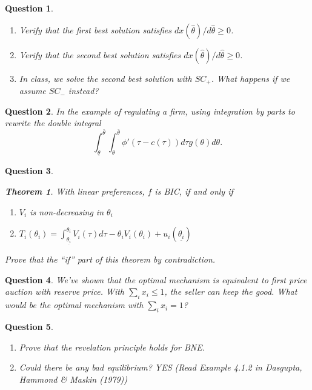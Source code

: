 \documentclass[11pt,leqno]{article}
\newtheorem{theorem}{Theorem}
\newtheorem{HW}{Question}
\begin{document}
\begin{HW}
\begin{enumerate}
    \item Verify that the first best solution satisfies $d x(\hat{\theta})/d \hat{\theta}\geq 0$.
    \item Verify that the second best solution satisfies $d x(\hat{\theta})/d \hat{\theta}\geq 0$.
    \item In class, we solve the second best solution with $SC_{+}$. What happens if we assume $SC_{-}$ instead?
\end{enumerate}

\end{HW}


\begin{HW}
    In the example of regulating a firm, using integration by parts to rewrite the double integral $$\int_{\underset{\bar{}}{\theta}}^{\bar{\theta}} \int_{\theta}^{\bar{\theta}}\phi'(\tau-c(\tau))d\tau g(\theta)d\theta.$$ 
\end{HW}

\begin{HW}
    \begin{theorem}
        With linear preferences, $f$ is BIC, if and only if 
        \begin{enumerate}
            \item $V_{i}$ is non-decreasing in $\theta_{i}$
            \item $T_{i}(\theta_{i})=\int_{\underset{\bar{}}{\theta_{i}}}^{\theta_{i}}V_{i}(\tau)d\tau-\theta_{i}V_{i}(\theta_{i})+u_{i}(\underset{\bar{}}{\theta_{i}})$
        \end{enumerate}
    \end{theorem}
Prove that the ``if'' part of this theorem by contradiction.
\end{HW}

\begin{HW}
    We've shown that the optimal mechanism is equivalent to first price auction with reserve price. With $\sum_{i}x_{i}\leq 1$, the seller can keep the good. What would be the optimal mechanism with $\sum_{i}x_{i}= 1$?
\end{HW}


\begin{HW}
\begin{enumerate}
    \item  Prove that the revelation principle holds for BNE.
    \item Could there be any bad equilibrium? YES (Read Example 4.1.2 in Dasgupta, Hammond \& Maskin (1979))
\end{enumerate}
\end{HW}
\end{document}

